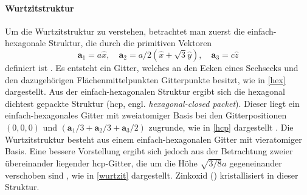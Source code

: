 \paragraph{Wurtzitstruktur}
Um die Wurtzitstruktur zu verstehen, betrachtet man zuerst die einfach-hexagonale Struktur, die durch die primitiven
Vektoren
\begin{equation}
    \mathbf{a}_1 = a\hat{x}, \quad
    \mathbf{a}_2 = a/2 (\hat{x} + \sqrt{3} \hat{y}), \quad
    \mathbf{a}_3 = c \hat{z}
    \label{eq:hex}
\end{equation}
definiert ist \autocite{Ashcroft}.
Es entsteht ein Gitter, welches an den Ecken eines Sechsecks und den dazugehörigen Flächenmittelpunkten Gitterpunkte
besitzt, wie in \cref{hex} dargestellt.
Aus der einfach-hexagonalen Struktur ergibt sich die hexagonal dichtest gepackte Struktur
(hcp, engl. \textit{hexagonal-closed packet}).
Dieser liegt ein einfach-hexagonales Gitter mit zweiatomiger Basis bei den Gitterpositionen $(0,0,0)$ und
$(\mathbf{a}_1/3 + \mathbf{a}_2/3 + \mathbf{a}_3/2)$ zugrunde, wie in \cref{hcp} dargestellt \autocite{Ashcroft}.
Die Wurtzitstruktur besteht aus einem einfach-hexagonalen Gitter mit vieratomiger Basis.
Eine bessere Vorstellung ergibt sich jedoch aus der Betrachtung zweier übereinander liegender hcp-Gitter, die um
die Höhe $\sqrt {3 / 8} a$ gegeneinander verschoben sind \autocite{Grundmann}, wie in \cref{wurtzit} dargestellt.
Zinkoxid () kristallisiert in dieser Struktur.

